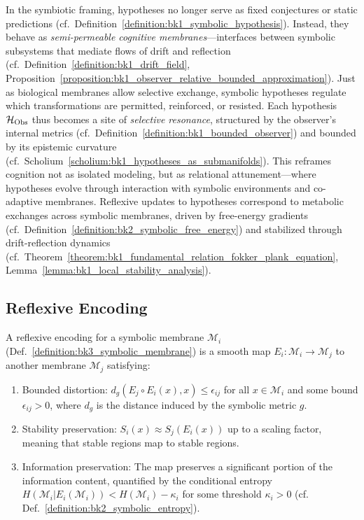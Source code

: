 \begin{scholium} \label{scholium:bk3_hypotheses_as_cognitive_membranes}
In the symbiotic framing, hypotheses no longer serve as fixed conjectures or static predictions (cf.~Definition~\ref{definition:bk1_symbolic_hypothesis}). Instead, they behave as \emph{semi-permeable cognitive membranes}—interfaces between symbolic subsystems that mediate flows of drift and reflection (cf.~Definition~\ref{definition:bk1_drift_field}, Proposition~\ref{proposition:bk1_observer_relative_bounded_approximation}).
Just as biological membranes allow selective exchange, symbolic hypotheses regulate which transformations are permitted, reinforced, or resisted. Each hypothesis \(\mathcal{H}_{\mathrm{Obs}}\) thus becomes a site of \emph{selective resonance}, structured by the observer’s internal metrics (cf.~Definition~\ref{definition:bk1_bounded_observer}) and bounded by its epistemic curvature (cf.~Scholium~\ref{scholium:bk1_hypotheses_as_submanifolds}).
This reframes cognition not as isolated modeling, but as relational attunement—where hypotheses evolve through interaction with symbolic environments and co-adaptive membranes. Reflexive updates to hypotheses correspond to metabolic exchanges across symbolic membranes, driven by free-energy gradients (cf.~Definition~\ref{definition:bk2_symbolic_free_energy}) and stabilized through drift-reflection dynamics (cf.~Theorem~\ref{theorem:bk1_fundamental_relation_fokker_plank_equation}, Lemma~\ref{lemma:bk1_local_stability_analysis}).\end{scholium}

\subsection{Reflexive Encoding}

\begin{definition} \label{definition:bk3_reflexive_encoding}
A reflexive encoding for a symbolic membrane $\mathcal{M}_i$ (Def.~\ref{definition:bk3_symbolic_membrane}) is a smooth map $E_i: \mathcal{M}_i \rightarrow \mathcal{M}_j$ to another membrane $\mathcal{M}_j$ satisfying:
\begin{enumerate}
    \item Bounded distortion: $d_g(E_j \circ E_i(x), x) \leq \epsilon_{ij}$ for all $x \in \mathcal{M}_i$ and some bound $\epsilon_{ij} > 0$, where $d_g$ is the distance induced by the symbolic metric $g$.
    \item Stability preservation: $S_i(x) \approx S_j(E_i(x))$ up to a scaling factor, meaning that stable regions map to stable regions.
    \item Information preservation: The map preserves a significant portion of the information content, quantified by the conditional entropy $H(\mathcal{M}_i | E_i(\mathcal{M}_i)) < H(\mathcal{M}_i) - \kappa_i$ for some threshold $\kappa_i > 0$ (cf. Def.~\ref{definition:bk2_symbolic_entropy}).
\end{enumerate}
\end{definition}

